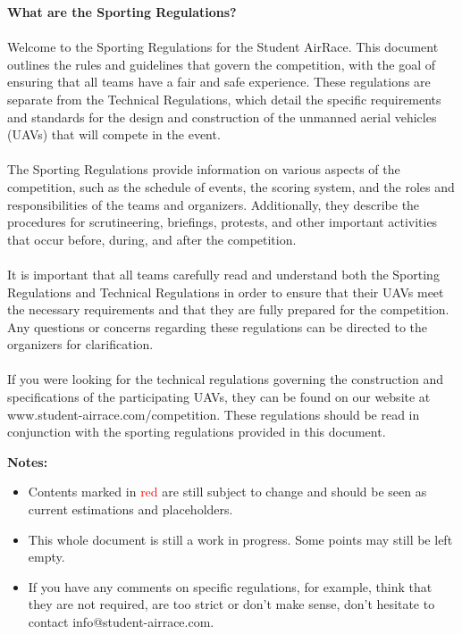 \newpage
{\bf What are the Sporting Regulations?} \\ \\
Welcome to the Sporting Regulations for the Student AirRace. This document outlines the rules and guidelines that govern the competition, with the goal of ensuring that all teams have a fair and safe experience. These regulations are separate from the Technical Regulations, which detail the specific requirements and standards for the design and construction of the unmanned aerial vehicles (UAVs) that will compete in the event.
\\ \\
The Sporting Regulations provide information on various aspects of the competition, such as the schedule of events, the scoring system, and the roles and responsibilities of the teams and organizers. Additionally, they describe the procedures for scrutineering, briefings, protests, and other important activities that occur before, during, and after the competition.
\\ \\
It is important that all teams carefully read and understand both the Sporting Regulations and Technical Regulations in order to ensure that their UAVs meet the necessary requirements and that they are fully prepared for the competition. Any questions or concerns regarding these regulations can be directed to the organizers for clarification.
\\ \\
If you were looking for the technical regulations governing the construction and specifications of the participating UAVs, they can be found on our website at www.student-airrace.com/competition. These regulations should be read in conjunction with the sporting regulations provided in this document.

\newpage
{\bf Notes:
\begin{itemize}
  \item Contents marked in \textcolor{red}{red} are still subject to change and should be seen as current estimations and placeholders.
  \item This whole document is still a work in progress. Some points may still be left empty.
  \item If you have any comments on specific regulations, for example, think that they are not required, are too strict or don't make sense, don't hesitate to contact info@student-airrace.com.
\end{itemize}
}
\hspace{10mm}

